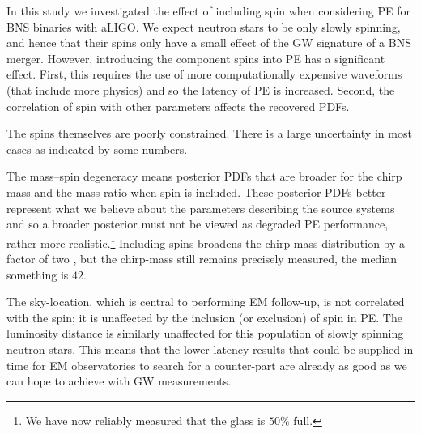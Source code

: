 In this study we investigated the effect of including spin when considering PE for BNS binaries with aLIGO. We expect neutron stars to be only slowly spinning, and hence that their spins only have a small effect of the GW signature of a BNS merger. However, introducing the component spins into PE has a significant effect. First, this requires the use of more computationally expensive waveforms (that include more physics) and so the latency of PE is increased. Second, the correlation of spin with other parameters affects the recovered PDFs.

The spins themselves are poorly constrained. There is a large uncertainty in most cases as indicated by some numbers.

The mass--spin degeneracy means posterior PDFs that are broader for the chirp mass and the mass ratio when spin is included. These posterior PDFs better represent what we believe about the parameters describing the source systems and so a broader posterior must not be viewed as degraded PE performance, rather more realistic.\footnote{We have now reliably measured that the glass is $50\%$ full.} Including spins broadens the chirp-mass distribution by a factor of two \citep{Poisson_1995,Berry_2014}, but the chirp-mass still remains precisely measured, the median something is $42$.

The sky-location, which is central to performing EM follow-up, is not correlated with the spin; it is unaffected by the inclusion (or exclusion) of spin in PE. The luminosity distance is similarly unaffected for this population of slowly spinning neutron stars. This means that the lower-latency results that could be supplied in time for EM observatories to search for a counter-part are already as good as we can hope to achieve with GW measurements.